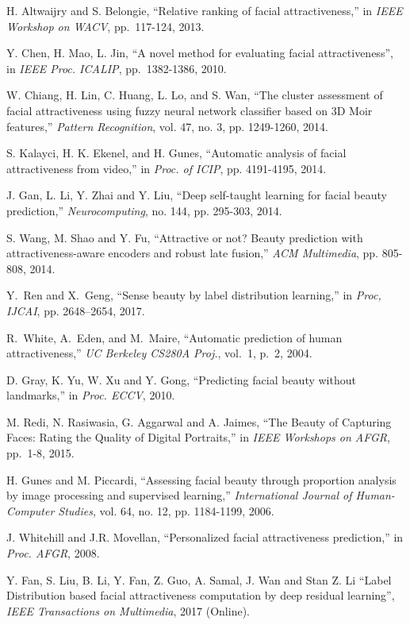 \documentclass[10pt,conference,a4paper]{IEEEtran}
\begin{document}
\begin{thebibliography}{1}
H. Altwaijry and S. Belongie, ``Relative ranking of facial attractiveness,'' in \emph{IEEE Workshop on WACV}, pp.~117-124, 2013.

Y. Chen, H. Mao, L. Jin, ``A novel method for evaluating facial attractiveness'', in \emph{IEEE Proc. ICALIP}, pp.~1382-1386, 2010.

W. Chiang, H. Lin, C. Huang, L. Lo, and S. Wan, ``The cluster assessment of facial attractiveness using fuzzy neural network classifier based on 3D Moir features,'' \emph{Pattern Recognition}, vol. 47, no. 3, pp. 1249-1260, 2014.

S. Kalayci, H. K. Ekenel, and H. Gunes, ``Automatic analysis of facial attractiveness from video,'' in \emph{Proc. of ICIP}, pp. 4191-4195, 2014.

J. Gan, L. Li, Y. Zhai and Y. Liu, ``Deep self-taught learning for facial beauty prediction,'' \emph{Neurocomputing}, no. 144, pp. 295-303, 2014.

S. Wang, M. Shao and Y. Fu, ``Attractive or not? Beauty prediction with attractiveness-aware encoders and robust late fusion,'' \emph{ACM Multimedia}, pp. 805-808, 2014.

Y.~Ren and X.~Geng, ``Sense beauty by label distribution learning,'' in
  \emph{Proc, IJCAI}, pp. 2648--2654, 2017.

R.~White, A.~Eden, and M.~Maire, ``Automatic prediction of human
  attractiveness,'' \emph{UC Berkeley CS280A Proj.}, vol.~1, p.~2, 2004.

D. Gray, K. Yu, W. Xu and Y. Gong, ``Predicting facial beauty without landmarks,'' in \emph{Proc. ECCV}, 2010.


M. Redi, N. Rasiwasia, G. Aggarwal and A. Jaimes, ``The Beauty of Capturing Faces: Rating the Quality of Digital Portraits,'' in \emph{IEEE Workshops on AFGR}, pp.~1-8, 2015.



H. Gunes and M. Piccardi, ``Assessing facial beauty through proportion analysis by image processing and supervised learning,'' \emph{International Journal of Human-Computer Studies}, vol. 64, no. 12, pp. 1184-1199, 2006.

J. Whitehill and J.R. Movellan, ``Personalized facial attractiveness prediction,''  in \emph{Proc. AFGR}, 2008.

Y. Fan, S. Liu, B. Li, Y. Fan, Z. Guo, A. Samal, J. Wan and Stan Z. Li ``Label Distribution based facial attractiveness computation by deep residual learning'', \emph{IEEE Transactions on Multimedia}, 2017 (Online).


\end{thebibliography}
\end{document}
